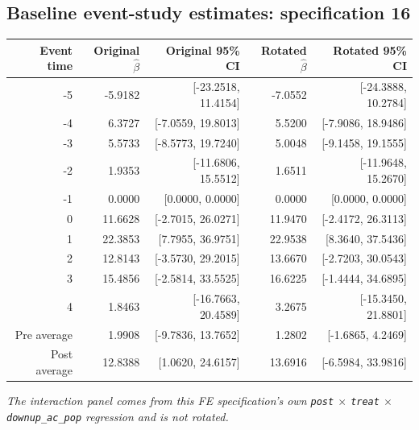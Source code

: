 \documentclass[10pt]{article}
\begin{document}
\subsection*{Baseline event-study estimates: specification 16}
\begin{center}
\scriptsize
\begin{tabular}{r rr rr}
\toprule
Event time & Original $\hat\beta$ & Original 95\% CI & Rotated $\hat\beta$ & Rotated 95\% CI \\
\midrule
-5 & -5.9182 & [-23.2518, 11.4154] & -7.0552 & [-24.3888, 10.2784] \\
-4 & 6.3727 & [-7.0559, 19.8013] & 5.5200 & [-7.9086, 18.9486] \\
-3 & 5.5733 & [-8.5773, 19.7240] & 5.0048 & [-9.1458, 19.1555] \\
-2 & 1.9353 & [-11.6806, 15.5512] & 1.6511 & [-11.9648, 15.2670] \\
-1 & 0.0000 & [0.0000, 0.0000] & 0.0000 & [0.0000, 0.0000] \\
0 & 11.6628 & [-2.7015, 26.0271] & 11.9470 & [-2.4172, 26.3113] \\
1 & 22.3853 & [7.7955, 36.9751] & 22.9538 & [8.3640, 37.5436] \\
2 & 12.8143 & [-3.5730, 29.2015] & 13.6670 & [-2.7203, 30.0543] \\
3 & 15.4856 & [-2.5814, 33.5525] & 16.6225 & [-1.4444, 34.6895] \\
4 & 1.8463 & [-16.7663, 20.4589] & 3.2675 & [-15.3450, 21.8801] \\
\midrule
Pre average & 1.9908 & [-9.7836, 13.7652] & 1.2802 & [-1.6865, 4.2469] \\
Post average & 12.8388 & [1.0620, 24.6157] & 13.6916 & [-6.5984, 33.9816] \\
\bottomrule
\end{tabular}
\end{center}
\medskip
\textit{The interaction panel comes from this FE specification's own \texttt{post} $\times$ \texttt{treat} $\times$ \texttt{downup\_ac\_pop} regression and is not rotated.}
\clearpage
\end{document}
